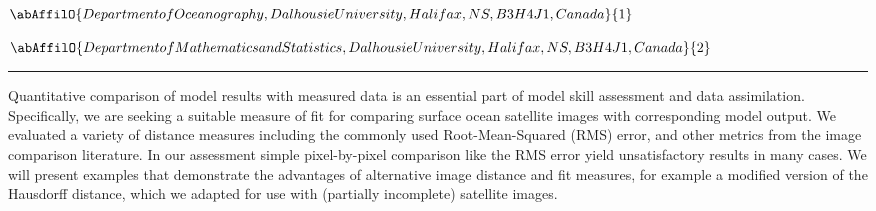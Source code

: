 \begin{minipage}{\linewidth}\begin{center}\begin{minipage}{\linewidth}
   \vspace{2 mm} \begin{center}
    \vspace{2 mm}\begin{center}
  
  $\abAffilO{Department of Oceanography, Dalhousie University, Halifax, NS, B3H 4J1, Canada}{1}$

  
  $\abAffilO{Department of Mathematics and Statistics, Dalhousie University, Halifax, NS, B3H 4J1, Canada}{2}$

  \end{center}
  \vspace{2 mm}
  \end{center}\end{minipage}\end{center}
  \begin{center}\rule{0.70\linewidth}{0.5 pt}\end{center}
  \begin{minipage}{\linewidth}
\noindent Quantitative comparison of model results with measured data is an essential part of model skill assessment and data assimilation. Specifically, we are seeking a suitable measure of fit for comparing surface ocean satellite images with corresponding model output. We evaluated a variety of distance measures including the commonly used Root-Mean-Squared (RMS) error, and other metrics from the image comparison literature. In our assessment simple pixel-by-pixel comparison like the RMS error yield unsatisfactory results in many cases. We will present examples that demonstrate the advantages of alternative image distance and fit measures, for example a modified version of the Hausdorff distance, which we adapted for use with (partially incomplete) satellite images.
\end{minipage}\end{minipage}
